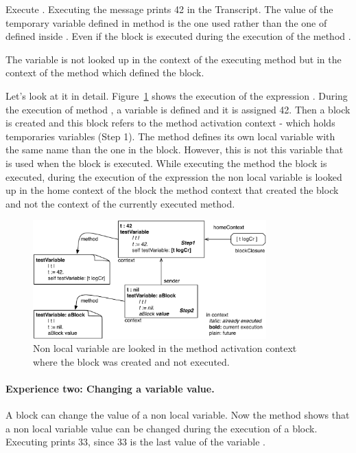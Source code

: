 \documentclass[a4paper,10pt,twoside]{book}
\begin{document}
Execute . Executing the  message  prints 42 in the Transcript. The value of the temporary variable  defined in method  is the one used rather than the one of  defined inside . Even if the block is executed during the execution of the method .

The variable  is not looked up in the context of the executing method  but in the context of the method  which defined the block.

Let's look at it in detail. Figure~\ref{fig:variable} shows the execution of the expression . During the execution of method , a variable  is defined and it is assigned 42. Then a block is created and this block refers to the method activation context - which holds temporaries variables (Step 1). The method  defines its own local variable  with the same name than the one in the block. However, this is not this variable that is used when the block is executed. While executing the method  the block is executed, during the execution of the expression  the non local variable  is looked up in the home context of the block \ie the method context that created the block and not the context of the currently executed method.

\begin{figure}[!h]
\begin{center}\includegraphics[width=9cm]{variable}
\caption{ Non local variable are looked in the method activation context where the block was created and not executed.\label{fig:variable}}
\end{center}
\end{figure}


\paragraph{Experience two: Changing a variable value.} A block can change the value of a non local variable.
Now the method  shows that a non local variable value can be changed during the execution of a block. Executing  prints 33, since 33 is the last value of the variable .
\end{document}
